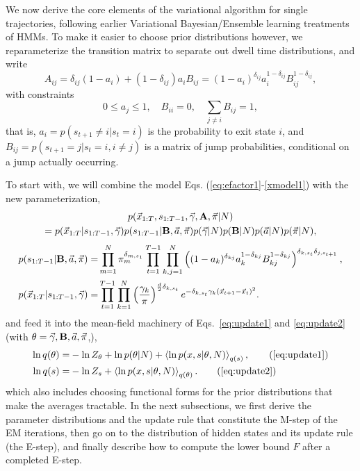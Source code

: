 We now derive the core elements of the variational algorithm for
single trajectories, following earlier Variational Bayesian/Ensemble
learning treatments of
HMMs\cite{Bronson2010,Mackay1997,Beal2003}.  To make it
easier to choose prior distributions however, we reparameterize the
transition matrix to separate out dwell time distributions, and write
\begin{equation}\label{eq:aBdef}
A_{ij}=\delta_{ij}(1-a_i)+(1-\delta_{ij})a_iB_{ij}=
(1-a_i)^{\delta_{ij}}a_i^{1-\delta_{ij}}B_{ij}^{1-\delta_{ij}},
\end{equation}
with constraints
\begin{equation}
0\le a_j\le 1,\quad B_{ii}=0,\quad \sum_{j\ne i}B_{ij}=1,
\end{equation}
that is, $a_i=p(s_{t+1}\ne i|s_t=i)$ is the probability to exit state $i$, and
$B_{ij}=p(s_{t+1}=j|s_t=i,i\ne j)$ is a matrix of jump probabilities,
conditional on a jump actually occurring.


To start with, we will combine the model
Eqs. (\ref{eq:efactor1}-\ref{xmodel1}) with the new parameterization,
\begin{multline}
\label{eq:efactor1b}
p(\vec{x}_{1:T},s_{1:T-1},\vec{\gamma},\mathbf{A},\vec\pi|N)\\
=p(\vec{x}_{1:T}|s_{1:T-1},\vec{\gamma})
p(s_{1:T-1}|\mathbf{B},\vec{a},\vec\pi)
p(\vec{\gamma}|N)p(\mathbf{B}|N)p(\vec{a}|N)p(\vec\pi|N),
\end{multline}
\begin{align}
\label{smodel1b}
  p(s_{1:T-1}|\mathbf{B},\vec a,\vec{\pi})=&
  \prod_{m=1}^N\pi_m^{\delta_{m,s_1}}
  \prod_{t=1}^{T-1}\prod_{k,j=1}^N 
  \left((1-a_k)^{\delta_{kj}}a_k^{1-\delta_{kj}}
  B_{kj}^{1-\delta_{kj}}\right)^{\delta_{k,s_t}\delta_{j,s_{t+1}}},\\
    \label{xmodel1b}
    p(\vec{x}_{1:T}|s_{1:T-1},\vec\gamma)=&
    \prod_{t=1}^{T-1}\prod_{k=1}^N\left(
    \frac{\gamma_k}{\pi}\right)^{\frac d2\delta_{k,s_t}}
    e^{-\delta_{k,s_t}\gamma_k(\vec{x}_{t+1}-\vec{x}_t)^2}. 
\end{align}
and feed it into the mean-field machinery of Eqs.~\eqref{eq:update1}
and \eqref{eq:update2} (with
$\theta=\vec{\gamma},\mathbf{B},\vec{a},\vec{\pi}$,),
\begin{align}
  \ln q(\theta)=&-\ln Z_\theta+\ln p(\theta|N)
  +\mean{\ln p(x,s|\theta,N)}_{q(s)},\tag{\ref{eq:update1}}\\
  \ln q(s)=&-\ln Z_s+\mean{\ln p(x,s|\theta,N)}_{q(\theta)}.
\tag{\ref{eq:update2}}
\end{align}
which also includes choosing functional forms for the prior
distributions that make the averages tractable. In the next
subsections, we first derive the parameter distributions and the
update rule that constitute the M-step of the EM iterations, then go on
to the distribution of hidden states and its update rule (the E-step),
and finally describe how to compute the lower bound $F$ after a
completed E-step.

